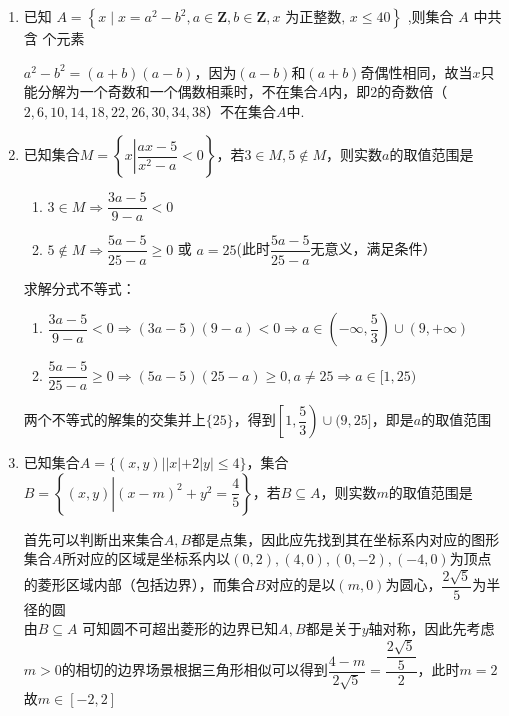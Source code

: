 \begin{enumerate}
\begin{jieda}
\begin{dingautolist}{172}
        所以“整数 $a,b$ 属于同一‘类’” 的充要条件是 “ $a - b \in  \left\lbrack  0\right\rbrack$ ”
        \end{dingautolist}
    \end{jieda}
    \item 已知 $A = \left\{  {x \mid  x = {a}^{2} - {b}^{2},a \in  \mathbf{Z},b \in  \mathbf{Z},x\text{ 为正整数, }x \leq  {40}}\right\}$ ,则集合 $A$ 中共含 个元素
    \begin{jieda}
        $a^2-b^2 = (a+b)(a-b)$，因为$(a-b)$和$(a+b)$奇偶性相同，故当$x$只能分解为一个奇数和一个偶数相乘时，不在集合$A$内，即$2$的奇数倍（$2,6,10,14,18,22,26,30,34,38$）不在集合$A$中.
    \end{jieda}
    \item 已知集合$M = \left\{x \left| \dfrac{ax- 5}{x^2-a} < 0 \right.\right\}$，若$3 \in M, 5 \notin M$，则实数$a$的取值范围是
    \begin{jieda}
        \begin{enumerate}
            \item $3 \in M \Longrightarrow \dfrac{3a - 5}{9-a} < 0$
            \item $5 \notin M \Longrightarrow \dfrac{5a - 5}{25-a} \geq 0$ 或 $a = 25$(此时$\dfrac{5a - 5}{25-a}$无意义，满足条件）
        \end{enumerate}
        求解分式不等式：
        \begin{enumerate}
            \item $\dfrac{3a - 5}{9-a} < 0 \Longrightarrow (3a-5)(9-a) < 0 \Longrightarrow a \in (-\infty, \dfrac{5}{3}) \cup (9, +\infty)$
            \item $\dfrac{5a - 5}{25-a} \geq 0 \Longrightarrow (5a-5)(25-a) \geq 0, a \neq 25 \Longrightarrow a \in [1, 25)$
        \end{enumerate}
        两个不等式的解集的交集并上$\{25\}$，得到$\left[1, \dfrac{5}{3}\right) \cup (9, 25]$，即是$a$的取值范围
    \end{jieda}
    \item 已知集合$A = \{(x, y) | |x| + 2|y| \leq 4\}$，集合$B = \left\{(x, y) \left| (x-m)^2 + y^2 = \dfrac{4}{5}\right.\right\}$，若$B \subseteq A$，则实数$m$的取值范围是\blkda[4]{$[-2,2]$}
    \begin{jieda}
        首先可以判断出来集合$A, B$都是点集，因此应先找到其在坐标系内对应的图形\\
        集合$A$所对应的区域是坐标系内以$(0, 2), (4, 0), (0, -2), (-4, 0)$为顶点的菱形区域内部（包括边界），而集合$B$对应的是以$(m, 0)$为圆心，$\dfrac{2\sqrt{5}}{5}$为半径的圆\\
        由$B \subseteq A$ 可知圆不可超出菱形的边界已知$A, B$都是关于$y$轴对称，因此先考虑$m > 0$的相切的边界场景根据三角形相似可以得到$\dfrac{4-m}{2\sqrt{5}} = \dfrac{\dfrac{2\sqrt{5}}{5}}{2}$，此时$m = 2$故$m \in [-2,2]$
    \end{jieda}
\end{enumerate}
\clearpage
